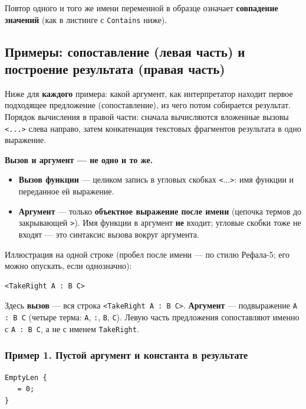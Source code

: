 \documentclass[12pt,a4paper]{article}
\begin{document}
Повтор одного и того же имени переменной в образце означает \textbf{совпадение значений} (как в листинге с \texttt{Contains} ниже).

\subsection{Примеры: сопоставление (левая часть) и построение результата (правая часть)}

Ниже для \textbf{каждого} примера: какой аргумент, как интерпретатор находит первое подходящее предложение (сопоставление), из чего потом собирается результат. Порядок вычисления в правой части: сначала вычисляются вложенные вызовы \texttt{<...>} слева направо, затем конкатенация текстовых фрагментов результата в одно выражение.

\medskip
\noindent\textbf{Вызов и аргумент --- не одно и то же.}
\begin{itemize}
  \item \textbf{Вызов функции} --- целиком запись в угловых скобках \texttt{<$\ldots$>}: имя функции и переданное ей выражение.
  \item \textbf{Аргумент} --- только \textbf{объектное выражение после имени} (цепочка термов до закрывающей \texttt{>}). Имя функции в аргумент \textbf{не} входит; угловые скобки тоже не входят --- это синтаксис вызова вокруг аргумента.
\end{itemize}

\noindent Иллюстрация на одной строке (пробел после имени --- по стилю Рефала-5; его можно опускать, если однозначно):

\begin{lstlisting}
<TakeRight A : B C>
\end{lstlisting}

Здесь \textbf{вызов} --- вся строка \texttt{<TakeRight A : B C>}. \textbf{Аргумент} --- подвыражение \texttt{A : B C} (четыре терма: \texttt{A}, \texttt{:}, \texttt{B}, \texttt{C}). Левую часть предложения сопоставляют именно с \texttt{A : B C}, а не с именем \texttt{TakeRight}.

\subsubsection*{Пример 1. Пустой аргумент и константа в результате}

\begin{lstlisting}
EmptyLen {
   = 0;
}
\end{lstlisting}
\end{document}
